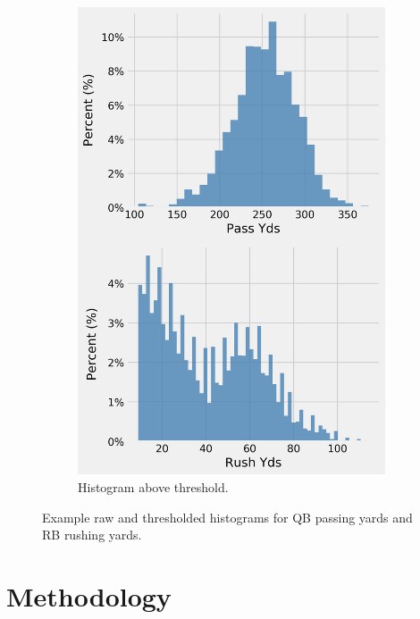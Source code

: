 \documentclass[12pt]{article}
\begin{document}
\begin{figure}[H]
\begin{subfigure}[b]{0.450\textwidth}
    \includegraphics[width=1\textwidth]{../figures/no_theshold_example_hists_RB}
    \caption{Histogram above threshold.}
     \label{example hist rush yds}
  \end{subfigure}
  \caption{Example raw and thresholded histograms for QB passing yards and RB rushing yards.}
  
\end{figure}


\pagebreak
\section{Methodology}
\end{document}
